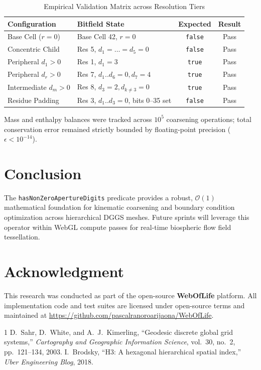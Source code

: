 \documentclass[10pt,journal,compsoc]{IEEEtran}
\begin{document}
\begin{table}[h]
\centering
\caption{Empirical Validation Matrix across Resolution Tiers}
\label{tab:validation}
\begin{tabular}{@{}llcc@{}}
\toprule
\textbf{Configuration} & \textbf{Bitfield State} & \textbf{Expected} & \textbf{Result} \\
\midrule
Base Cell ($r=0$) & Base Cell 42, $r=0$ & \texttt{false} & Pass \\
Concentric Child & Res 5, $d_1 = \dots = d_5 = 0$ & \texttt{false} & Pass \\
Peripheral $d_1 > 0$ & Res 1, $d_1 = 3$ & \texttt{true} & Pass \\
Peripheral $d_r > 0$ & Res 7, $d_1..d_6 = 0, d_7 = 4$ & \texttt{true} & Pass \\
Intermediate $d_m > 0$ & Res 8, $d_3 = 2, d_{k \neq 3} = 0$ & \texttt{true} & Pass \\
Residue Padding & Res 3, $d_1..d_3=0$, bits 0--35 set & \texttt{false} & Pass \\
\bottomrule
\end{tabular}
\end{table}

Mass and enthalpy balances were tracked across $10^5$ coarsening operations; total conservation error remained strictly bounded by floating-point precision ($\epsilon < 10^{-14}$).

\section{Conclusion}
The \texttt{hasNonZeroApertureDigits} predicate provides a robust, $\mathcal{O}(1)$ mathematical foundation for kinematic coarsening and boundary condition optimization across hierarchical DGGS meshes. Future sprints will leverage this operator within WebGL compute passes for real-time biospheric flow field tessellation.

\section*{Acknowledgment}
This research was conducted as part of the open-source \textbf{WebOfLife} platform. All implementation code and test suites are licensed under open-source terms and maintained at \url{https://github.com/pascalranoroarijaona/WebOfLife}.


\begin{thebibliography}{1}
D.~Sahr, D.~White, and A.~J.~Kimerling, ``Geodesic discrete global grid systems,'' \emph{Cartography and Geographic Information Science}, vol.~30, no.~2, pp.~121--134, 2003.
I.~Brodsky, ``H3: A hexagonal hierarchical spatial index,'' \emph{Uber Engineering Blog}, 2018.
\end{thebibliography}
\end{document}
